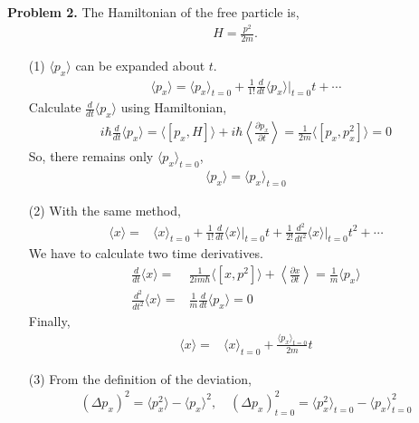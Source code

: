 \documentclass[aps,floatfix,nofootinbib,superscriptaddress,fleqn]{revtex4}
\begin{document}
\noindent \textbf{Problem 2.} The Hamiltonian of the free particle is,
\begin{align}
          H = \frac{p^2}{2m}.
\end{align}
\begin{itemize}
\item[(1)] $\langle p_x \rangle$ can be expanded about $t$.
\begin{align}
          \langle p_x \rangle = \langle p_x \rangle_{t=0}+\frac{1}{1!}\frac{d}{dt}\langle p_x \rangle \Bigg|_{t=0}t+\cdots
\end{align}
Calculate $\frac{d}{dt}\langle p_x \rangle$ using Hamiltonian,
\begin{align}
          i\hbar\frac{d}{dt}\langle p_x \rangle=\langle \left[p_x,H\right] \rangle+i\hbar \left\langle \frac{\partial p_x}{\partial t} \right\rangle
          =\frac{1}{2m}\langle \left[p_x,p_x^2\right] \rangle = 0
\end{align}
So, there remains only $ \langle p_x \rangle_{t=0}$,
\begin{align}
          \langle p_x\rangle = \langle p_x \rangle_{t=0}
\end{align}
\item[(2)] With the same method,
 \begin{align}
          \langle x\rangle=&\langle x\rangle_{t=0}+\frac{1}{1!}\frac{d}{dt}\langle x \rangle \Bigg|_{t=0}t+\frac{1}{2!}\frac{d^2}{dt^2}\langle x \rangle \Bigg|_{t=0}t^2+\cdots
 \end{align}
 We have to calculate two time derivatives.
 \begin{align}          
  \frac{d}{dt}\langle x \rangle =& \frac{1}{2im\hbar}\langle \left[x,p^2\right] \rangle+\left\langle \frac{\partial x}{\partial t} \right\rangle
                                =  \frac{1}{m}\langle p_x \rangle \\
  \frac{d^2}{dt^2}\langle x \rangle =& \frac{1}{m}\frac{d}{dt}\langle p_x \rangle=0
 \end{align}
Finally,
\begin{align}
          \langle x\rangle=&\langle x\rangle_{t=0}+\frac{\langle p_x \rangle_{t=0}}{2m}t
\end{align}
\item[(3)]From the definition of the deviation,
 \begin{align}
          {(\Delta p_x)}^2 = \langle p_x^2\rangle - \langle p_x\rangle^2, \quad {(\Delta p_x)}^2_{t=0} = \langle p_x^2\rangle_{t=0} - \langle p_x\rangle^2_{t=0}
 \end{align}

\end{itemize}
\end{document}
